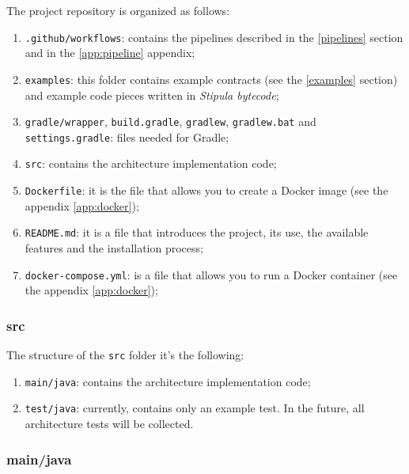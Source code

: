The project repository \autocite{site:stipula-github} is organized as follows:
\begin{enumerate}
  \item \verb|.github/workflows|: contains the pipelines described in the \ref{pipelines} section and in 
  the \ref{app:pipeline} appendix;
  \item \verb|examples|: this folder contains example contracts (see the \ref{examples} section) and 
  example code pieces written in \textit{Stipula bytecode};
  \item \verb|gradle/wrapper|, \verb|build.gradle|, \verb|gradlew|, \verb|gradlew.bat| and 
  \verb|settings.gradle|: files needed for Gradle;
  \item \verb|src|: contains the architecture implementation code;
  \item \verb|Dockerfile|: it is the file that allows you to create a Docker image (see the appendix 
  \ref{app:docker});
  \item \verb|README.md|: it is a file that introduces the project, its use, the available features and 
  the installation process;
  \item \verb|docker-compose.yml|: is a file that allows you to run a Docker container (see the appendix 
  \ref{app:docker});
\end{enumerate}

\subsubsection{src}

The structure of the \verb|src| folder it's the following:
\begin{enumerate}
  \item \verb|main/java|: contains the architecture implementation code;
  \item \verb|test/java|: currently, contains only an example test. In the future, all architecture 
  tests will be collected.
\end{enumerate}

\subsubsection{main/java}

